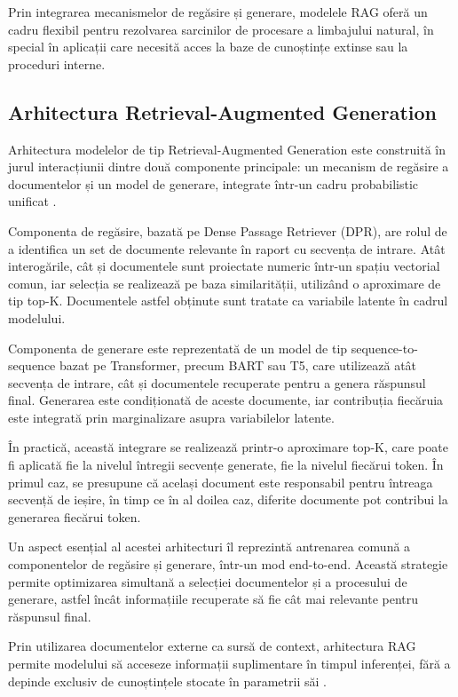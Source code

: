 \documentclass[12pt, a4paper, oneside, romanian]{teza-upb}
\begin{document}
Prin integrarea mecanismelor de regăsire și generare, modelele RAG oferă un cadru flexibil pentru rezolvarea sarcinilor de procesare a limbajului natural, în special în aplicații care necesită acces la baze de cunoștințe extinse \cite{lewis2020retrieval} sau la proceduri interne.


\subsection{Arhitectura Retrieval-Augmented Generation}

Arhitectura modelelor de tip Retrieval-Augmented Generation este construită în jurul interacțiunii dintre două componente principale: un mecanism de regăsire a documentelor și un model de generare, integrate într-un cadru probabilistic unificat \cite{lewis2020retrieval}.

Componenta de regăsire, bazată pe Dense Passage Retriever (DPR), are rolul de a identifica un set de documente relevante în raport cu secvența de intrare. Atât interogările, cât și documentele sunt proiectate numeric într-un spațiu vectorial comun, iar selecția se realizează pe baza similarității, utilizând o aproximare de tip top-K. Documentele astfel obținute sunt tratate ca variabile latente în cadrul modelului.

Componenta de generare este reprezentată de un model de tip sequence-to-sequence bazat pe Transformer, precum BART sau T5, care utilizează atât secvența de intrare, cât și documentele recuperate pentru a genera răspunsul final. Generarea este condiționată de aceste documente, iar contribuția fiecăruia este integrată prin marginalizare asupra variabilelor latente.

În practică, această integrare se realizează printr-o aproximare top-K, care poate fi aplicată fie la nivelul întregii secvențe generate, fie la nivelul fiecărui token. În primul caz, se presupune că același document este responsabil pentru întreaga secvență de ieșire, în timp ce în al doilea caz, diferite documente pot contribui la generarea fiecărui token.

Un aspect esențial al acestei arhitecturi îl reprezintă antrenarea comună a componentelor de regăsire și generare, într-un mod end-to-end. Această strategie permite optimizarea simultană a selecției documentelor și a procesului de generare, astfel încât informațiile recuperate să fie cât mai relevante pentru răspunsul final.

Prin utilizarea documentelor externe ca sursă de context, arhitectura RAG permite modelului să acceseze informații suplimentare în timpul inferenței, fără a depinde exclusiv de cunoștințele stocate în parametrii săi \cite{lewis2020retrieval}.
\end{document}
